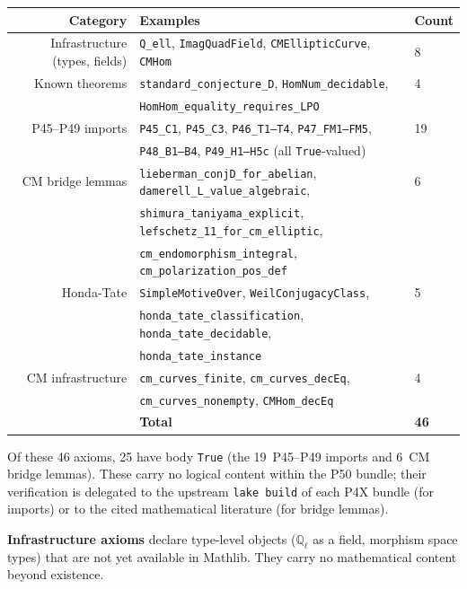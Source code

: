 \documentclass[11pt]{article}
\theoremstyle{definition}
\theoremstyle{remark}
\newcommand{\Q}{\mathbb{Q}}
\newcommand{\Qell}{\Q_\ell}
\begin{document}
\begin{center}
\small
\begin{tabular}{rll}
\toprule
\textbf{Category} & \textbf{Examples} & \textbf{Count} \\
\midrule
Infrastructure (types, fields) & \texttt{Q\_ell}, \texttt{ImagQuadField}, \texttt{CMEllipticCurve}, \texttt{CMHom} & 8 \\
Known theorems & \texttt{standard\_conjecture\_D}, \texttt{HomNum\_decidable}, & 4 \\
& \texttt{HomHom\_equality\_requires\_LPO} & \\
P45--P49 imports & \texttt{P45\_C1}, \texttt{P45\_C3}, \texttt{P46\_T1--T4}, \texttt{P47\_FM1--FM5}, & 19 \\
& \texttt{P48\_B1--B4}, \texttt{P49\_H1--H5c} (all \texttt{True}-valued) & \\
CM bridge lemmas & \texttt{lieberman\_conjD\_for\_abelian}, \texttt{damerell\_L\_value\_algebraic}, & 6 \\
& \texttt{shimura\_taniyama\_explicit}, \texttt{lefschetz\_11\_for\_cm\_elliptic}, & \\
& \texttt{cm\_endomorphism\_integral}, \texttt{cm\_polarization\_pos\_def} & \\
Honda-Tate & \texttt{SimpleMotiveOver}, \texttt{WeilConjugacyClass}, & 5 \\
& \texttt{honda\_tate\_classification}, \texttt{honda\_tate\_decidable}, & \\
& \texttt{honda\_tate\_instance} & \\
CM infrastructure & \texttt{cm\_curves\_finite}, \texttt{cm\_curves\_decEq}, & 4 \\
& \texttt{cm\_curves\_nonempty}, \texttt{CMHom\_decEq} & \\
\midrule
& \textbf{Total} & \textbf{46} \\
\bottomrule
\end{tabular}
\end{center}

\smallskip\noindent
Of these 46 axioms, 25 have body \texttt{True} (the 19~P45--P49 imports and 6~CM bridge lemmas). These carry no logical content within the P50 bundle; their verification is delegated to the upstream \texttt{lake build} of each P4X bundle (for imports) or to the cited mathematical literature (for bridge lemmas).

\smallskip\noindent
\textbf{Infrastructure axioms} declare type-level objects ($\Qell$ as a field, morphism space types) that are not yet available in Mathlib. They carry no mathematical content beyond existence.
\end{document}
